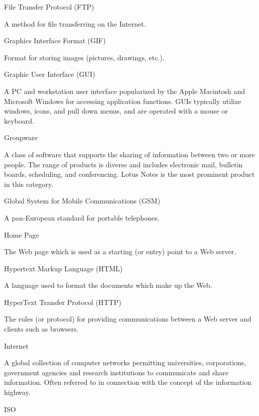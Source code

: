 \begin{htmllist}
\item[File Transfer Protocol (FTP)]

A method for file transferring on the Internet.


\item[Graphics Interface Format (GIF)]

Format for storing images (pictures, drawings, etc.).


\item[Graphic User Interface (GUI)]

A PC and workstation user interface popularized by the Apple Macintosh
and Microsoft Windows for accessing application functions. GUIs
typically utilize windows, icons, and pull down menus, and are operated
with a mouse or keyboard.


\item[Groupware]

A class of software that supports the sharing of information between
two or more people. The range of products is diverse and includes
electronic mail, bulletin boards, scheduling, and conferencing. Lotus
Notes is the most prominent product in this category.


\item[Global System for Mobile Communications (GSM)]

A pan-European standard for portable telephones.


\item[Home Page]

The Web page which is used as a starting (or entry) point to a Web
server.


\item[Hypertext Markup Language (HTML)]

A language used to format the documents which make up the Web.


\item[HyperText Transfer Protocol (HTTP)]

The rules (or protocol) for providing communications between a Web
server and clients such as browsers.


\item[Internet]

A global collection of computer networks permitting universities,
corporations, government agencies and research institutions to
communicate and share information. Often referred to in connection with
the concept of the information highway.


\item[ISO]


\end{htmllist}
